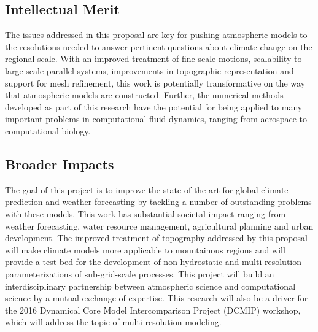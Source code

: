 \documentclass[11pt]{article}
\begin{document}
\subsection*{Intellectual Merit}
\vspace{-0.5cm}

The issues addressed in this proposal are key for pushing atmospheric models to the resolutions needed to answer pertinent questions about climate change on the regional scale.  With an improved treatment of fine-scale motions, scalability to large scale parallel systems, improvements in topographic representation and support for mesh refinement, this work is potentially transformative on the way that atmospheric models are constructed.  Further, the numerical methods developed as part of this research have the potential for being applied to many important problems in computational fluid dynamics, ranging from aerospace to computational biology.

\vspace{-0.5cm}
\subsection*{Broader Impacts}
\vspace{-0.5cm}

The goal of this project is to improve the state-of-the-art for global climate prediction and weather forecasting by tackling a number of outstanding problems with these models.  This work has substantial societal impact ranging from weather forecasting, water resource management, agricultural planning and urban development.  The improved treatment of topography addressed by this proposal will make climate models more applicable to mountainous regions and will provide a test bed for the development of non-hydrostatic and multi-resolution parameterizations of sub-grid-scale processes.  This project will build an interdisciplinary partnership between atmospheric science and computational science by a mutual exchange of expertise.  This research will also be a driver for the 2016 Dynamical Core Model Intercomparison Project (DCMIP) workshop, which will address the topic of multi-resolution modeling.
\end{document}
